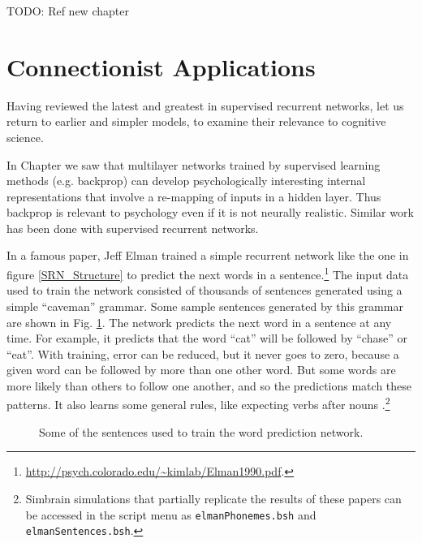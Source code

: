 TODO: Ref  new chapter

\section{Connectionist Applications}\label{internalRepsRecurrent}

Having reviewed the latest and greatest in supervised recurrent networks, let us return to earlier and simpler models, to examine their relevance to cognitive science.


In Chapter  we saw that multilayer networks trained by supervised learning methods (e.g. backprop) can develop psychologically interesting internal representations that involve a re-mapping of inputs in a hidden layer. Thus backprop is relevant to psychology even if it is not neurally realistic. Similar work has been done with supervised recurrent networks. 

In a famous paper, Jeff Elman trained a simple recurrent network like the one in figure \ref{SRN_Structure} to predict the next words in a sentence.\footnote{\url{http://psych.colorado.edu/~kimlab/Elman1990.pdf}.}  The input data used to train the network consisted of thousands of sentences generated using a simple ``caveman'' grammar. Some sample sentences generated by this grammar are shown in Fig. \ref{elman_sentences}. The network predicts the next word in  a sentence at any time. For example, it predicts that the word ``cat'' will be followed by ``chase'' or ``eat''. With training, error can be reduced, but it never goes to zero, because a given word can be followed by more than one other word. But some words are more likely than others to follow one another, and so the predictions match these patterns. It also learns some general rules, like expecting verbs after nouns \cite{elman1990finding}.\footnote{Simbrain simulations that partially replicate the results of these papers can be accessed in the script menu as \texttt{elmanPhonemes.bsh} and \texttt{elmanSentences.bsh}.}

\begin{figure}[h]
\centering
{}
\caption[Generated by Jeff Yoshimi based on \cite{elman1990finding}.]{Some of the sentences used to train the word prediction network.}
\label{elman_sentences}
\end{figure}

